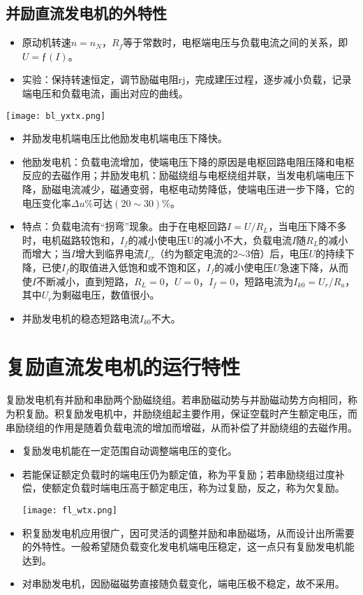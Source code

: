 \documentclass[blue]{elegantnote}
\begin{document}
\subsection{并励直流发电机的外特性}
\begin{itemize}
	\item 原动机转速$n=n_N$，$R_f$等于常数时，电枢端电压与负载电流之间的关系，即$U=ƒ(I)$。
	\item 实验：保持转速恒定，调节励磁电阻rj，完成建压过程，逐步减小负载，记录端电压和负载电流，画出对应的曲线。 
\end{itemize}
\begin{center}
	\texttt{[image: bl\_yxtx.png]}
\end{center}
\begin{note}
	\begin{itemize}
		\item 	并励发电机端电压比他励发电机端电压下降快。
		\item  	他励发电机：负载电流增加，使端电压下降的原因是电枢回路电阻压降和电枢反应的去磁作用；并励发电机：励磁绕组与电枢绕组并联，当发电机端电压下降，励磁电流减少，磁通变弱，电枢电动势降低，使端电压进一步下降，它的电压变化率$\Delta u\%$可达$(20\sim30)\%$。 
		\item 特点：负载电流有“拐弯”现象。由于在电枢回路$I=U/R_L$，当电压下降不多时，电机磁路较饱和，$I_f$的减小使电压U的减小不大，负载电流$I$随$R_L$的减小而增大；当$I$增大到临界电流$I_{cr}$（约为额定电流的2$\sim$3倍）后，电压$U$的持续下降，已使$I_f$的取值进入低饱和或不饱和区，$I_f$的减小使电压$U$急速下降，从而使$I$不断减小，直到短路，$R_L=0$，$U=0$，$I_f=0$，短路电流为$I_{k0}=U_r/R_a$，其中$U_r$为剩磁电压，数值很小。
		\item 并励发电机的稳态短路电流$I_{k0}$不大。 	
	\end{itemize}
\end{note}
\section{复励直流发电机的运行特性}
复励发电机有并励和串励两个励磁绕组。若串励磁动势与并励磁动势方向相同，称为积复励。积复励发电机中，并励绕组起主要作用，保证空载时产生额定电压，而串励绕组的作用是随着负载电流的增加而增磁，从而补偿了并励绕组的去磁作用。
\begin{itemize}
	\item 复励发电机能在一定范围自动调整端电压的变化。 
	\item 若能保证额定负载时的端电压仍为额定值，称为平复励；若串励绕组过度补偿，使额定负载时端电压高于额定电压，称为过复励，反之，称为欠复励。 
\begin{center}
	\texttt{[image: fl\_wtx.png]}
\end{center}
	\item 积复励发电机应用很广，因可灵活的调整并励和串励磁场，从而设计出所需要的外特性。一般希望随负载变化发电机端电压稳定，这一点只有复励发电机能达到。
	\item 对串励发电机，因励磁磁势直接随负载变化，端电压极不稳定，故不采用。 	
\end{itemize}
\end{document}
